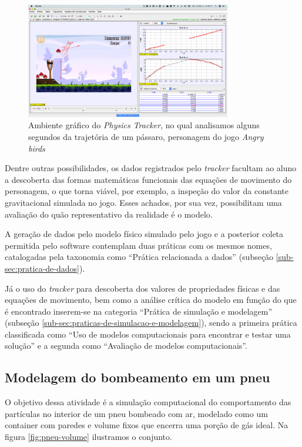 \begin{figure}[!htb]
  \caption{Ambiente gráfico do \textit{Physics Tracker}, no qual analisamos alguns segundos da trajetória de um pássaro, personagem do jogo \textit{Angry birds}}
  \begin{center}
    \includegraphics[width=0.8\textwidth]{imagens/physics-tracker}
  \end{center}
  \label{fig:physics-tracker}
\end{figure}

Dentre outras possibilidades, os dados registrados pelo \textit{tracker} facultam ao aluno a descoberta das formas matemáticas funcionais das equações de movimento do personagem, o que torna viável, por exemplo, a inspeção do valor da constante gravitacional simulada no jogo. Esses achados, por sua vez, possibilitam uma avaliação do quão representativo da realidade é o modelo. 

A geração de dados pelo modelo físico simulado pelo jogo e a posterior coleta permitida pelo software contemplam duas práticas com os mesmos nomes, catalogadas pela taxonomia como ``Prática relacionada a dados'' (subseção \ref{sub-sec:pratica-de-dados}). 

Já o uso do \textit{tracker} para descoberta dos valores de propriedades físicas e das equações de movimento, bem como a análise crítica do modelo em função do que é encontrado inserem-se na categoria ``Prática de simulação e modelagem'' (subseção \ref{sub-sec:praticas-de-simulacao-e-modelagem}), sendo a primeira prática classificada como ``Uso de modelos computacionais para encontrar e testar uma solução''  e a segunda como ``Avaliação de modelos computacionais''.   

\subsection{Modelagem do bombeamento em um pneu}

O objetivo dessa atividade é a simulação computacional do comportamento das partículas no interior de um pneu bombeado com ar, modelado como um container com paredes e volume fixos que encerra uma porção de gás ideal. Na figura \ref{fig:pneu-volume} ilustramos o conjunto.

